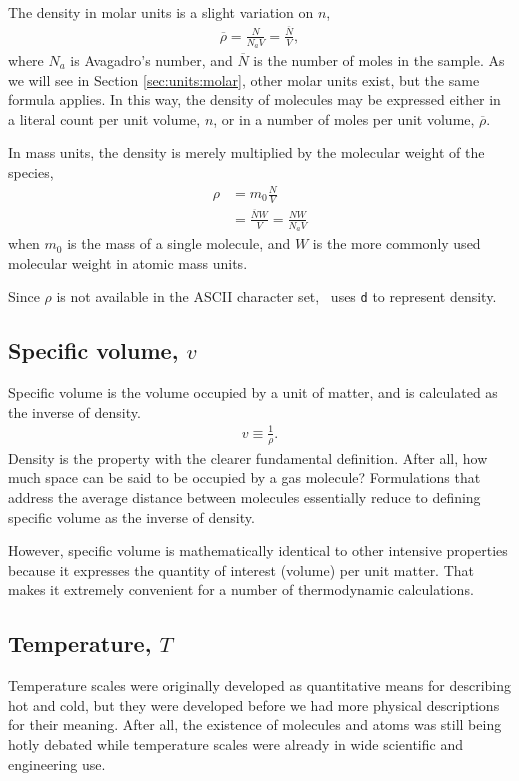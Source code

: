 The density in molar units is a slight variation on $n$,
\begin{align}
\overline{\rho} = \frac{N}{N_a V} = \frac{\overline{N}}{V},
\end{align}
where $N_a$ is Avagadro's number, and $\overline{N}$ is the number of moles in the sample.  As we will see in Section \ref{sec:units:molar}, other molar units exist, but the same formula applies.  In this way, the density of molecules may be expressed either in a literal count per unit volume, $n$, or in a number of moles per unit volume, $\overline{\rho}$.

In mass units, the density is merely multiplied by the molecular weight of the species,
\begin{align}
\rho &= m_0 \frac{N}{V}\\
 &= \frac{\overline{N} W}{V} = \frac{N W}{N_a V}\nonumber
\end{align}
when $m_0$ is the mass of a single molecule, and $W$ is the more commonly used molecular weight in atomic mass units.

Since $\rho$ is not available in the ASCII character set, \PM\ uses \verb|d| to represent density.

\subsection{Specific volume, $v$}

Specific volume is the volume occupied by a unit of matter, and is calculated as the inverse of density.
\begin{align}
v \equiv \frac{1}{\rho}.
\end{align}
Density is the property with the clearer fundamental definition.  After all, how much space can be said to be occupied by a gas molecule?  Formulations that address the average distance between molecules essentially reduce to defining specific volume as the inverse of density.

However, specific volume is mathematically identical to other intensive properties because it expresses the quantity of interest (volume) per unit matter.  That makes it extremely convenient for a number of thermodynamic calculations.

\subsection{Temperature, $T$}

Temperature scales were originally developed as quantitative means for describing hot and cold, but they were developed before we had more physical descriptions for their meaning.  After all, the existence of molecules and atoms was still being hotly debated while temperature scales were already in wide scientific and engineering use.

